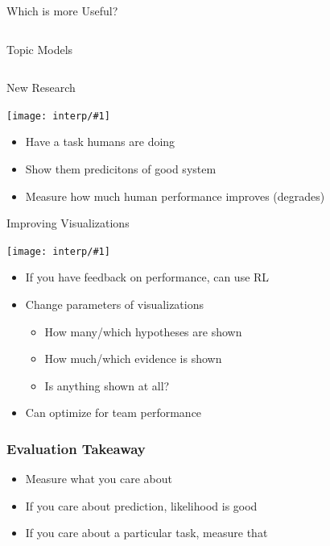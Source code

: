 \documentclass[compress]{beamer}
\newcommand{\gfx}[2]{
\begin{center}
	\texttt{[image: interp/\#1]}
\end{center}
}
\begin{document}
\begin{frame}{Which is more Useful?}
{\begin{columns}
\begin{block}{Topic Models}
    \end{block}


\end{columns}
}

\end{frame}






\begin{frame}{New Research}

  \gfx{interp_predictions}{.8}
  \begin{itemize}
    \item Have a task humans are doing
    \item Show them predicitons of good system
    \item Measure how much human performance improves (degrades)
  \end{itemize}
\end{frame}

\begin{frame}{Improving Visualizations}

  \gfx{viz_human_loop}{.8}

  \begin{itemize}
    \item If you have feedback on performance, can use RL
    \item Change parameters of visualizations
      \begin{itemize}
        \item How many/which hypotheses are shown
        \item How much/which evidence is shown
        \item Is anything shown at all?
      \end{itemize}
    \item Can optimize for team performance 
  \end{itemize}

\end{frame}

\begin{frame}
  \frametitle{Evaluation Takeaway}

  \begin{itemize}
    \item Measure what you care about
      \item If you care about prediction, likelihood is good
\item If you care about a particular task, measure that
    \end{itemize}

\end{frame}
\end{document}
